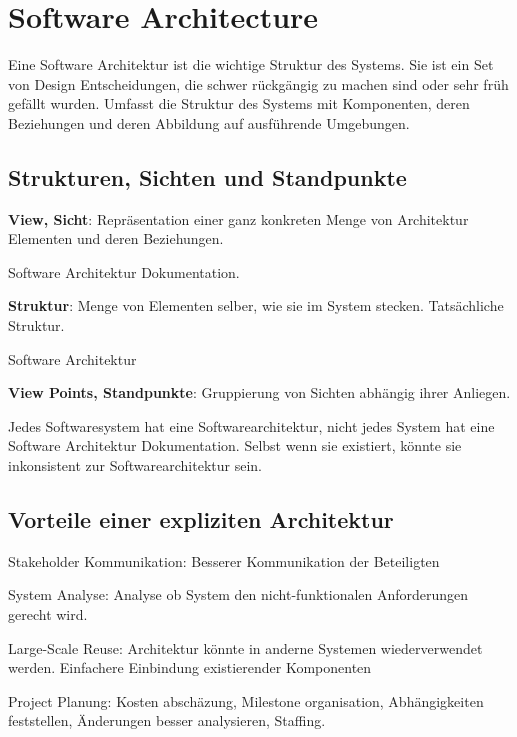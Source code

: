 \chapter{Software Architecture}

Eine Software Architektur ist die wichtige Struktur des Systems.
Sie ist ein Set von Design Entscheidungen, die schwer rückgängig zu
machen sind oder sehr früh gefällt wurden. Umfasst die Struktur des Systems
mit Komponenten, deren Beziehungen und deren Abbildung auf ausführende Umgebungen.

\section{Strukturen, Sichten und Standpunkte}
\begin{compactitem}
    \item \textbf{View, Sicht}: Repräsentation einer ganz konkreten Menge von
    Architektur Elementen und deren Beziehungen.
    \begin{compactitem}
        \item Software Architektur Dokumentation.
    \end{compactitem}
    \item \textbf{Struktur}: Menge von Elementen selber, wie sie im System stecken.
    Tatsächliche Struktur.
    \begin{compactitem}
        \item Software Architektur
    \end{compactitem}
    \item \textbf{View Points, Standpunkte}: Gruppierung von Sichten abhängig
    ihrer Anliegen.
\end{compactitem}

Jedes Softwaresystem hat eine Softwarearchitektur, nicht jedes System hat eine
Software Architektur Dokumentation. Selbst wenn sie existiert, könnte sie
inkonsistent zur Softwarearchitektur sein.

\section{Vorteile einer expliziten Architektur}
\begin{compactitem}
    \item Stakeholder Kommunikation: Besserer Kommunikation der Beteiligten
    \item System Analyse: Analyse ob System den nicht-funktionalen Anforderungen
    gerecht wird.
    \item Large-Scale Reuse: Architektur könnte in anderne Systemen wiederverwendet
    werden. Einfachere Einbindung existierender Komponenten
    \item Project Planung: Kosten abschäzung, Milestone organisation, Abhängigkeiten
    feststellen, Änderungen besser analysieren, Staffing.
\end{compactitem}


